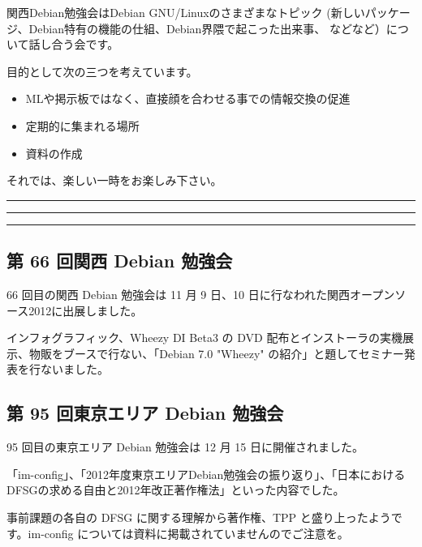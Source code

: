 \documentclass[mingoth,a4paper]{jsarticle}
\begin{document}
 関西Debian勉強会はDebian GNU/Linuxのさまざまなトピック
 (新しいパッケージ、Debian特有の機能の仕組、Debian界隈で起こった出来事、
 などなど）について話し合う会です。

 目的として次の三つを考えています。
 \begin{itemize}
  \item MLや掲示板ではなく、直接顔を合わせる事での情報交換の促進
  \item 定期的に集まれる場所
  \item 資料の作成
 \end{itemize}

 それでは、楽しい一時をお楽しみ下さい。

\newpage

\begin{minipage}[b]{0.2\hsize}
 {}
\end{minipage}
\begin{minipage}[b]{0.8\hsize}
\hrule
\vspace{2mm}
\hrule
\setcounter{tocdepth}{1}
\tableofcontents
\vspace{2mm}
\hrule
\end{minipage}


\subsection{第 66 回関西 Debian 勉強会}

66 回目の関西 Debian 勉強会は 11 月 9 日、10 日に行なわれた関西オープンソース2012に出展しました。

インフォグラフィック、Wheezy DI Beta3 の DVD 配布とインストーラの実機展示、物販をブースで行ない、「Debian 7.0 "Wheezy" の紹介」と題してセミナー発表を行ないました。


\subsection{第 95 回東京エリア Debian 勉強会}
95 回目の東京エリア Debian 勉強会は 12 月 15 日に開催されました。

「im-config」、「2012年度東京エリアDebian勉強会の振り返り」、「日本におけるDFSGの求める自由と2012年改正著作権法」といった内容でした。

事前課題の各自の DFSG に関する理解から著作権、TPP と盛り上ったようです。im-config については資料に掲載されていませんのでご注意を。
\end{document}
